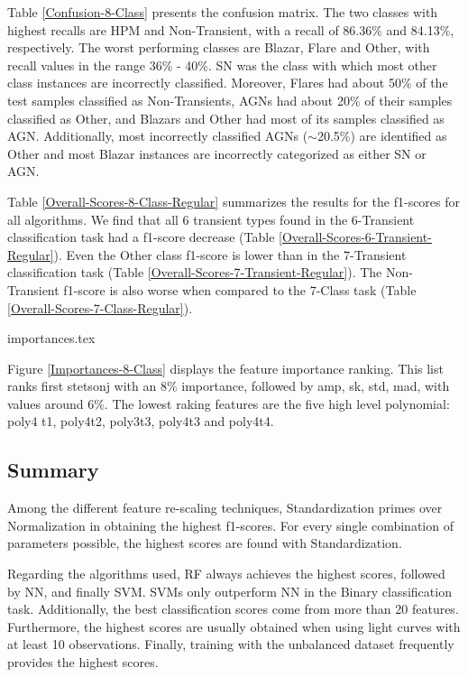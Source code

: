 \documentclass[a4paper,fleqn,usenatbib]{mnras}
\begin{document}
Table \ref{Confusion-8-Class} presents the confusion matrix.
The two classes with highest recalls are HPM and Non-Transient, with a
recall of 86.36\% and 84.13\%, respectively. 
The worst performing classes are Blazar, Flare and Other, with recall
values in the range 36\% - 40\%. 
SN was the class with which most other class instances are
incorrectly classified. 
Moreover, Flares had about 50\% of the test samples classified as
Non-Transients, AGNs had about 20\% of their 
samples classified as Other, and Blazars and Other had most of  its
samples classified as AGN. 
Additionally, most incorrectly classified AGNs ($\sim$20.5\%) are
identified as Other and most Blazar instances are
incorrectly categorized as either SN or AGN. 

Table \ref{Overall-Scores-8-Class-Regular} summarizes the results
for the f1-scores for all algorithms. 
We find that all 6 transient types found in the
6-Transient classification task had a f1-score decrease (Table
\ref{Overall-Scores-6-Transient-Regular}). 
Even the Other class f1-score is lower than in the 7-Transient classification task (Table
\ref{Overall-Scores-7-Transient-Regular}).
The Non-Transient f1-score is also worse when compared to the 7-Class
task (Table \ref{Overall-Scores-7-Class-Regular}).  


{importances.tex}

Figure \ref{Importances-8-Class} displays the feature importance ranking.
This list ranks first stetson\textunderscore j with an 8\% importance,
followed by amp, sk, std, mad, with values around 6\%. 
The lowest raking features are the five high level polynomial: poly4\textunderscore
t1,  poly4\textunderscore t2, poly3\textunderscore t3,
poly4\textunderscore t3 and poly4\textunderscore t4. 


\subsection{Summary}

Among the different feature re-scaling techniques, Standardization
primes over Normalization in obtaining the highest f1-scores. 
For every single combination of parameters possible, the highest
scores are found with Standardization. 

Regarding the algorithms used, RF always achieves the highest scores,
followed by NN,  and finally SVM. 
SVMs only outperform NN  in the Binary classification task. 
Additionally,  the best classification scores come from more than 20
features. 
Furthermore, the highest scores are usually obtained when using light
curves with at least 10 observations. 
Finally, training with the unbalanced dataset frequently provides the
highest scores.  
\end{document}
